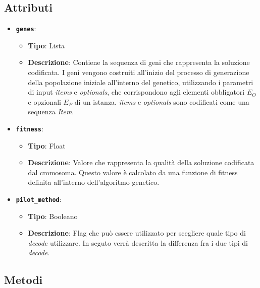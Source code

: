\subsection{Attributi}

\begin{itemize}
    \item \textbf{\texttt{genes}}:
    \begin{itemize}
        \item \textbf{Tipo}: Lista
        \item \textbf{Descrizione}: Contiene la sequenza di geni che rappresenta la soluzione codificata. I geni vengono costruiti all'inizio del processo di generazione della popolazione iniziale all'interno del genetico, utilizzando i parametri di input \emph{items} e \emph{optionals}, che corrispondono agli elementi obbligatori \( E_O \) e opzionali \( E_P \) di un istanza. \emph{items} e \emph{optionals} sono codificati come una sequenza \emph{Item}.
    \end{itemize}
    \item \textbf{\texttt{fitness}}:
    \begin{itemize}
        \item \textbf{Tipo}: Float
        \item \textbf{Descrizione}: Valore che rappresenta la qualità della soluzione codificata dal cromosoma. Questo valore è calcolato da una funzione di fitness definita all'interno dell'algoritmo genetico.
    \end{itemize}
    \item \textbf{\texttt{pilot\_method}}:
    \begin{itemize}
        \item \textbf{Tipo}: Booleano
        \item \textbf{Descrizione}: Flag che può essere utilizzato per scegliere quale tipo di \emph{decode} utilizzare. In seguto verrà descritta la differenza fra i due tipi di \emph{decode}.
    \end{itemize}
\end{itemize}

\subsection{Metodi}

